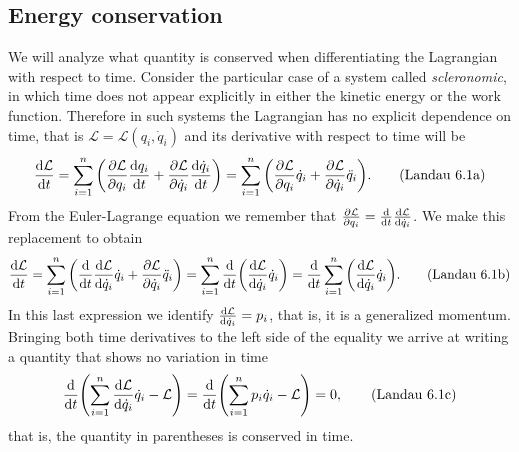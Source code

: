 \documentclass[12pt, english, a4paper]{article}
\begin{document}
\subsection{Energy conservation}\label{conservacionEnergia} %
We will analyze what quantity is conserved when differentiating the Lagrangian with respect to time.
Consider the particular case of a system called \emph{scleronomic}, in which time does not appear explicitly in either the kinetic energy or the work function.
Therefore in such systems the Lagrangian has no explicit dependence on time, that is \(\mathcal{L}= \mathcal{L}(q_i, \dot{q}_i)\) and its derivative with respect to time will be
\begin{equation}\label{Landau6.1a}
	\dv{\mathcal{L}}{t}= \sum_{i=1}^n \pqty{ \pdv{\mathcal{L}}{q_i} \dv{q_i}{t}+ \pdv{\mathcal{L}}{\dot{q}_i} \dv{\dot{q}_i}{t} }
	= \sum_{i=1}^n \pqty{ \pdv{\mathcal{L}}{q_i} \dot{q}_i+ \pdv{\mathcal{L}}{\dot{q}_i} \ddot{q}_i }.
    \tag{Landau 6.1a}
\end{equation}
From the Euler-Lagrange equation we remember that \(\pdv{\mathcal{L}}{q_i}= \dv{t} \dv{\mathcal{L}}{\dot{q}_i}\).
We make this replacement to obtain
\begin{equation}\label{Landau6.1b}
	\dv{\mathcal{L}}{t}= \sum_{i=1}^n \pqty{ \dv{t} \dv{\mathcal{L}}{\dot{q}_i} \dot{q}_i+ \pdv{\mathcal{L}}{\dot{q}_i} \ddot{q}_i }
	= \sum_{i=1}^n \dv{t} \pqty{ \dv{\mathcal{L}}{\dot{q}_i} \dot{q}_i }
	= \dv{t} \sum_{i=1}^n \pqty{ \dv{\mathcal{L}}{\dot{q}_i} \dot{q}_i }.
	\tag{Landau 6.1b}
\end{equation}
In this last expression we identify \(\dv{\mathcal{L}}{\dot{q}_i}= p_i\), that is, it is a generalized momentum.
Bringing both time derivatives to the left side of the equality we arrive at writing a quantity that shows no variation in time
\begin{equation}\label{Landau6.1c}
	\dv{t }\pqty{ \sum_{i=1}^n \dv{\mathcal{L}}{\dot{q}_i} \dot{q}_i - \mathcal{L}}= \dv{t} \pqty{ \sum_{i=1}^n p_i \dot{q}_i - \mathcal{L}}= 0,
	\tag{Landau 6.1c}
\end{equation}
that is, the quantity in parentheses is conserved in time.
\end{document}
